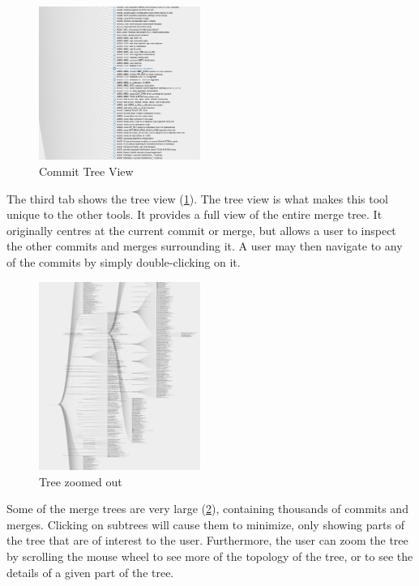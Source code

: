 \documentclass[conference, draftclsnofoot]{IEEEtran}
\begin{document}
\begin{figure}[h]
	\centering
	\includegraphics[width=0.47\textwidth]{figures/tree_view.png}
	\caption{Commit Tree View}
	\label{fig:tree}
\end{figure}

The third tab shows the tree view (\ref{fig:tree}). The tree view is what makes
this tool unique to the other tools. It provides a full view of the entire
merge tree. It originally centres at the current commit or merge, but allows a
user to inspect the other commits and merges surrounding it. A user may then
navigate to any of the commits by simply double-clicking on it.

\begin{figure}[h]
	\centering
	\includegraphics[width=0.47\textwidth]{figures/tree_zoom.png}
	\caption{Tree zoomed out}
	\label{fig:zoomed_tree}
\end{figure}

Some of the merge trees are very large (\ref{fig:zoomed_tree}), containing
thousands of commits and merges. Clicking on subtrees will cause them to
minimize, only showing parts of the tree that are of interest to the user.
Furthermore, the user can zoom the tree by scrolling the mouse wheel to see
more of the topology of the tree, or to see the details of a given part of the
tree.
\end{document}
